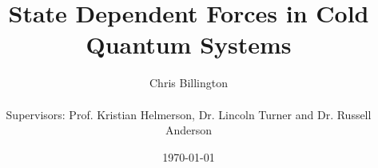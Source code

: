 \title{\Huge State Dependent Forces in Cold Quantum Systems}
\author{\LARGE Chris Billington\\\\
\Large Supervisors: Prof. Kristian Helmerson, Dr. Lincoln Turner and Dr. Russell Anderson}
\date{\today}

\begin{titlingpage}
\setlength{\droptitle}{0.3\textheight}
\maketitle

\end{titlingpage}


\tableofcontents
\clearpage
{}
